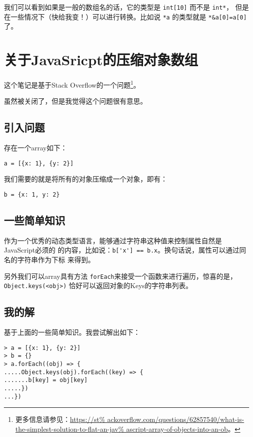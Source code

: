 我们可以看到如果是一般的数组名的话，它的类型是 \verb|int[10]| 而不是 \verb|int*|，
但是在一些情况下（快给我变！）可以进行转换。比如说 \verb|*a| 的类型就是 
\verb|*&a[0]=a[0]| 了。


\section{关于JavaSricpt的压缩对象数组}

这个笔记是基于Stack Overflow的一个问题\footnote{更多信息请参见：\url{https://st%
ackoverflow.com/questions/62857540/what-is-the-simplest-solution-to-flat-an-jav%
ascript-array-of-objects-into-an-ob}。}。

虽然被关闭了，但是我觉得这个问题很有意思。

\subsection{引入问题}

存在一个array如下：
\begin{lstlisting}
a = [{x: 1}, {y: 2}]
\end{lstlisting}

我们需要的就是将所有的对象压缩成一个对象，即有：
\begin{lstlisting}
b = {x: 1, y: 2}
\end{lstlisting}

\subsection{一些简单知识}

作为一个优秀的动态类型语言，能够通过字符串这种值来控制属性自然是JavaScript必须的%
的内容，比如说：\verb|b['x'] == b.x|。换句话说，属性可以通过同名的字符串作为下标%
来得到。

另外我们可以array具有方法 \verb|forEach|来接受一个函数来进行遍历，惊喜的是，
\verb|Object.keys(<obj>)| 恰好可以返回对象的Keys的字符串列表。

\subsection{我的解}

基于上面的一些简单知识。我尝试解出如下：
\begin{lstlisting}
> a = [{x: 1}, {y: 2}]
> b = {}
> a.forEach((obj) => {
.....Object.keys(obj).forEach((key) => {
.......b[key] = obj[key]
.....})
...})
\end{lstlisting}

